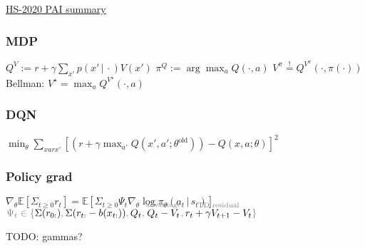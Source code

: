\documentclass[11pt]{article}
\newcommand{\IE}{\mathbb{E}}
\newcommand{\given}{\,|\,}
\newcommand{\slot}{{\cdot}}
\begin{document}
\href{https://github.com/numpde/pai_summary}{HS-2020 PAI summary}
{\tiny\color{lightgray}\hfill{\DTMnow}}

\subsubsection*{MDP} 

$
	Q^V := 
	r + \gamma \sum_{x'} p(x' \given \slot) V(x')
$
\quad
$
	\pi^Q := \arg\max_a Q(\slot, a)
$
\quad
$
	V^\pi \stackrel{!}{=} Q^{V^\pi}(\slot, \pi(\slot))
$
\quad
\hfill
Bellman:
$
	V^\star
	=
	\max_a
	Q^{V^\star}(\slot, a)
$

\subsubsection*{DQN}

$
	\min_\theta
	\sum_{xarx'}
	[
		(r + \gamma \max_{a'} Q(x', a'; \theta^\text{old}))
		-
		Q(x, a; \theta)
	]^2
$


\subsubsection*{Policy grad}

%
$
\nabla_\theta \IE[\Sigma_{t \geq 0} r_t] = 
\IE[\Sigma_{t \geq 0} \Psi_t \nabla_\theta \log \pi_\theta(a_t \given s_t)]
$
\hfill
$
	\color{gray}
	\Psi_t \in 
	\{
		{\color{black}
			\Sigma(r_{0:})
		},
		\hfill
		{\color{black}
			\Sigma(r_{t:} - b(x_{t:}))
		},
		\hfill
		{\color{black}
			Q_t
		},
		\hfill
		{\color{black}
			\smash{\stackrel{{
				\color{gray}
				\text{advantage}
			}}{Q_t - V_t}}
		},
		\hfill
		{\color{black}
			\smash{\stackrel{{
				\color{gray}
				\text{TD residual}
			}}{r_t + \gamma V_{t + 1} - V_t}}
		}
	\}
$

TODO: gammas?
%

\leavevmode\vfill
\end{document}
